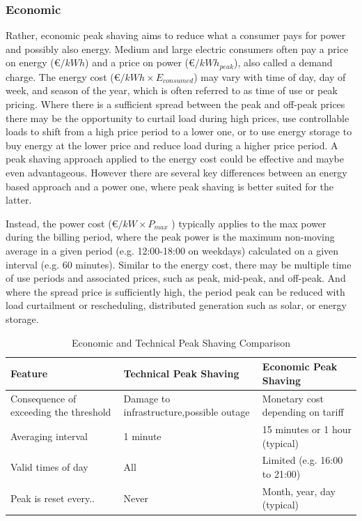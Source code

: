\documentclass[
]{article}
\begin{document}
\hypertarget{economic}{%
  \subsubsection{Economic}\label{economic}}

Rather, economic peak shaving aims to reduce what a consumer pays for
power and possibly also energy. Medium and large electric consumers
often pay a price on energy (€\(/kWh\)) and a price on power
(€\(/kWh_{peak}\)), also called a demand charge. The energy cost
(€\(/kWh \times E_{consumed}\)) may vary with time of day, day of week,
and season of the year, which is often referred to as time of use or
peak pricing. Where there is a sufficient spread between the peak and
off-peak prices there may be the opportunity to curtail load during high
prices, use controllable loads to shift from a high price period to a
lower one, or to use energy storage to buy energy at the lower price and
reduce load during a higher price period. A peak shaving approach
applied to the energy cost could be effective and maybe even
advantageous. However there are several key differences between an
energy based approach and a power one, where peak shaving is better
suited for the latter.

Instead, the power cost (€\(/kW \times P_{max}\) ) typically applies to
the max power during the billing period, where the peak power is the
maximum non-moving average in a given period (e.g. 12:00-18:00 on
weekdays) calculated on a given interval (e.g. 60 minutes). Similar to
the energy cost, there may be multiple time of use periods and
associated prices, such as peak, mid-peak, and off-peak. And where the
spread price is sufficiently high, the period peak can be reduced with
load curtailment or rescheduling, distributed generation such as solar,
or energy storage.



\begin{table}
    \centering
    \caption{Economic and Technical Peak Shaving Comparison}
    \label{tab:econ-tech-peak-shaving}
    \begin{tabularx}{\textwidth}{XXX}
    \toprule
    Feature & Technical Peak Shaving & Economic Peak Shaving  \\
    \midrule
    Consequence of exceeding the threshold & Damage to infrastructure,possible outage & Monetary cost depending on tariff \\
    Averaging interval                     & 1 minute                                 & 15 minutes or 1 hour (typical) \\
    Valid times of day                     & All                                      & Limited (e.g. 16:00 to 21:00) \\
    Peak is reset every..                  & Never                                    & Month, year, day (typical) \\
    \bottomrule
    \end{tabularx}
\end{table}
\end{document}
